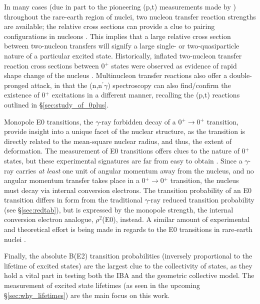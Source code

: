 In many cases (due in part to the pioneering (p,t) measurements made by \cite{Lesher_158Gdpt,Meyer_pt0_2006}) throughout the rare-earth region of nuclei, two nucleon transfer reaction strengths are available; the relative cross sections can provide a clue to pairing configurations in nucleons \cite{RevModPhys.83.1467}. This implies that a large relative cross section between two-nucleon transfers will signify a large single- or two-quasiparticle nature of a particular excited state. Historically, inflated two-nucleon transfer reaction cross sections between 0$^+$ states were observed as evidence of rapid shape change of the nucleus \cite{Clark_pairtransfer2009}. Multinucleon transfer reactions also offer a double-pronged attack, in that the (n,n$^\prime\gamma$) spectroscopy can also find/confirm the existence of 0$^+$ excitations in a different manner, recalling the (p,t) reactions outlined in \S \ref{sec:study_of_0plus}.

Monopole E0 transitions, the $\gamma$-ray forbidden decay of a 0$^+\rightarrow$0$^+$ transition, provide insight into a unique facet of the nuclear structure, as the transition is directly related to the mean-square nuclear radius, and thus, the extent of deformation. The measurement of E0 transitions offers clues to the nature of 0$^+$ states, but these experimental signatures are far from easy to obtain \cite{Heyde_text}. Since a $\gamma$-ray carries \textit{at least} one unit of angular momentum away from the nucleus, and no angular momentum transfer takes place in a 0$^+\rightarrow$0$^+$ transition, the nucleus must decay via internal conversion electrons. The transition probability of an E0 transition differs in form from the traditional $\gamma$-ray reduced transition probability (see \S \ref{sec:redtab}), but is expressed by the monopole strength, the internal conversion electron analogue, $\rho^2$(E0), instead. A similar amount of experimental and theoretical effort is being made in regards to the E0 transitions in rare-earth nuclei \cite{Ilie_E02011}. %

Finally, the absolute B(E2) transition probabilities (inversely proportional to the lifetime of excited states) are the largest clue to the collectivity of states, as they hold a vital part in testing both the IBA and the geometric collective model. The measurement of excited state lifetimes (as seen in the upcoming \S \ref{sec:why_lifetimes}) are the main focus on this work. 

